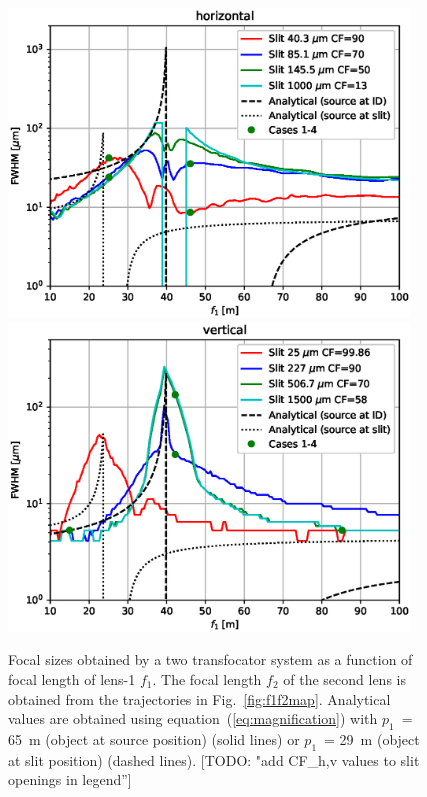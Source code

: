 \documentclass{iucr}              %
\newcommand{\todo}[1]{{\color{red}[TODO: "#1'']}}
\newcommand{\ingreen}[1]{{\color{green}#1}}
\begin{document}
\begin{figure}
    \centering
    
    \includegraphics[width=0.95\textwidth]{figures/sizes_h.eps}
    \includegraphics[width=0.95\textwidth]{figures/sizes_v.eps}
        
    \caption{Focal sizes obtained by a two transfocator system as a function of focal length of lens-1 $f_1$. The focal length $f_2$ of the second lens is obtained from the trajectories in Fig.~\ref{fig:f1f2map}. 
    Analytical values are obtained using equation~(\ref{eq:magnification}) with $p_1$~= \SI{65}{\meter} (object at source position) (solid lines) or $p_1$~= \SI{29}{\meter} (object at slit position) (dashed lines). 
    \todo{add CF\_h,v values to slit openings in legend}
    }
    \label{fig:focalSizes}
\end{figure}
\end{document}
